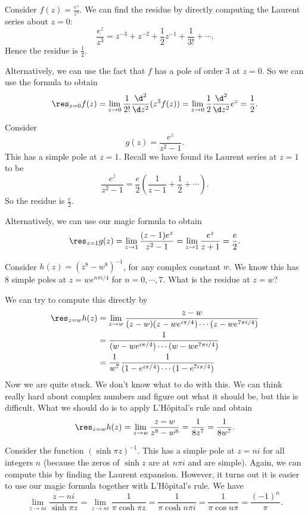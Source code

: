 \documentclass[a4paper]{article}
\begin{document}
\begin{eg}
  Consider $f(z) = \frac{e^z}{z^3}$. We can find the residue by directly computing the Laurent series about $z = 0$:
  \[
    \frac{e^z}{z^3} = z^{-3} + z^{-2} + \frac{1}{2}z^{-1} + \frac{1}{3!} + \cdots.
  \]
  Hence the residue is $\frac{1}{2}$.

  Alternatively, we can use the fact that $f$ has a pole of order $3$ at $z = 0$. So we can use the formula to obtain
  \[
    \res_{z = 0} f(z) = \lim_{z \to 0} \frac{1}{2!} \frac{\d^2}{\d z^2} (z^3 f(z)) = \lim_{z \to 0} \frac{1}{2} \frac{\d^2}{\d z^2} e^z = \frac{1}{2}.
  \]
\end{eg}

\begin{eg}
  Consider
  \[
    g(z) = \frac{e^z}{z^2 - 1}.
  \]
  This has a simple pole at $z = 1$. Recall we have found its Laurent series at $z = 1$ to be
  \[
    \frac{e^z}{z^2 - 1} = \frac{e}{2}\left(\frac{1}{z - 1} + \frac{1}{2} + \cdots\right).
  \]
  So the residue is $\frac{e}{2}$.

  Alternatively, we can use our magic formula to obtain
  \[
    \res_{z = 1} g(z) = \lim_{z \to 1} \frac{(z - 1)e^z}{z^2 - 1} = \lim_{z \to 1}\frac{e^z}{z + 1} = \frac{e}{2}.
  \]
\end{eg}

\begin{eg}
  Consider $h(z) = (z^8 - w^8)^{-1}$, for any complex constant $w$. We know this has $8$ simple poles at $z = w e^{n \pi i/4}$ for $n = 0, \cdots, 7$. What is the residue at $z = w$?

  We can try to compute this directly by
  \begin{align*}
    \res_{z = w} h(z) &= \lim_{z \to w} \frac{z - w}{(z - w)(z - w e^{i \pi /4}) \cdots (z - w e^{7 \pi i/4})}\\
    &= \frac{1}{(w - w e^{i \pi /4}) \cdots (w - w e^{7\pi i/4})}\\
    &= \frac{1}{w^7} \frac{1}{(1 - e^{i\pi/4})\cdots (1 - e^{7 i \pi/4})}
  \end{align*}
  Now we are quite stuck. We don't know what to do with this. We can think really hard about complex numbers and figure out what it should be, but this is difficult. What we should do is to apply L'H\^opital's rule and obtain
  \[
    \res_{z = w}h(z) = \lim_{z \to w} \frac{z - w}{z^8 - w^8} = \frac{1}{8z^7} = \frac{1}{8w^7}.
  \]
\end{eg}

\begin{eg}
  Consider the function $(\sinh \pi z)^{-1}$. This has a simple pole at $z = ni$ for all integers $n$ (because the zeros of $\sinh z$ are at $n\pi i$ and are simple). Again, we can compute this by finding the Laurent expansion. However, it turns out it is easier to use our magic formula together with L'H\^opital's rule. We have
  \[
    \lim_{z \to ni} \frac{z - ni}{\sinh \pi z} = \lim_{z \to ni} \frac{1}{\pi \cosh \pi z} = \frac{1}{\pi \cosh n\pi i} = \frac{1}{\pi \cos n\pi} = \frac{(-1)^n}{\pi}.
  \]
\end{eg}
\end{document}
